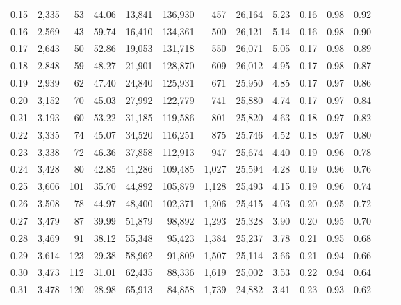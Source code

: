 \begin{tabular}{rrrrrrrrrrrrrr}
0.15 &  2,335 &   53 &   44.06 &   13,841 &  136,930 &     457 &  26,164 &   5.23 &  0.16 &  0.98 &      0.92 \\
0.16 &  2,569 &   43 &   59.74 &   16,410 &  134,361 &     500 &  26,121 &   5.14 &  0.16 &  0.98 &      0.90 \\
0.17 &  2,643 &   50 &   52.86 &   19,053 &  131,718 &     550 &  26,071 &   5.05 &  0.17 &  0.98 &      0.89 \\
0.18 &  2,848 &   59 &   48.27 &   21,901 &  128,870 &     609 &  26,012 &   4.95 &  0.17 &  0.98 &      0.87 \\
0.19 &  2,939 &   62 &   47.40 &   24,840 &  125,931 &     671 &  25,950 &   4.85 &  0.17 &  0.97 &      0.86 \\
0.20 &  3,152 &   70 &   45.03 &   27,992 &  122,779 &     741 &  25,880 &   4.74 &  0.17 &  0.97 &      0.84 \\
0.21 &  3,193 &   60 &   53.22 &   31,185 &  119,586 &     801 &  25,820 &   4.63 &  0.18 &  0.97 &      0.82 \\
0.22 &  3,335 &   74 &   45.07 &   34,520 &  116,251 &     875 &  25,746 &   4.52 &  0.18 &  0.97 &      0.80 \\
0.23 &  3,338 &   72 &   46.36 &   37,858 &  112,913 &     947 &  25,674 &   4.40 &  0.19 &  0.96 &      0.78 \\
0.24 &  3,428 &   80 &   42.85 &   41,286 &  109,485 &   1,027 &  25,594 &   4.28 &  0.19 &  0.96 &      0.76 \\
0.25 &  3,606 &  101 &   35.70 &   44,892 &  105,879 &   1,128 &  25,493 &   4.15 &  0.19 &  0.96 &      0.74 \\
0.26 &  3,508 &   78 &   44.97 &   48,400 &  102,371 &   1,206 &  25,415 &   4.03 &  0.20 &  0.95 &      0.72 \\
0.27 &  3,479 &   87 &   39.99 &   51,879 &   98,892 &   1,293 &  25,328 &   3.90 &  0.20 &  0.95 &      0.70 \\
0.28 &  3,469 &   91 &   38.12 &   55,348 &   95,423 &   1,384 &  25,237 &   3.78 &  0.21 &  0.95 &      0.68 \\
0.29 &  3,614 &  123 &   29.38 &   58,962 &   91,809 &   1,507 &  25,114 &   3.66 &  0.21 &  0.94 &      0.66 \\
0.30 &  3,473 &  112 &   31.01 &   62,435 &   88,336 &   1,619 &  25,002 &   3.53 &  0.22 &  0.94 &      0.64 \\
0.31 &  3,478 &  120 &   28.98 &   65,913 &   84,858 &   1,739 &  24,882 &   3.41 &  0.23 &  0.93 &      0.62 \\

\end{tabular}
